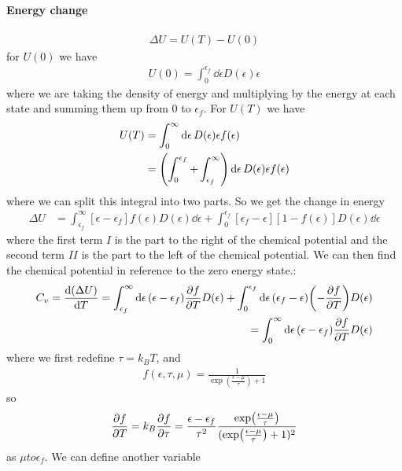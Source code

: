 \documentclass[../main.tex]{subfiles}
\begin{document}
\paragraph*{Energy change}
\begin{align*}
    \Delta U = U(T) - U(0)
\end{align*}
for $U(0)$ we have
\begin{align*}
    U(0) = \int_0^{\epsilon_f} \dd{\epsilon} D(\epsilon) \epsilon
\end{align*}
where we are taking the density of energy and multiplying by the energy at each state and summing 
them up from $0$ to $\epsilon_f$. For $U(T)$ we have
\begin{align*}
    U(T) &= \int_0^{\infty} \dd{\epsilon} D(\epsilon) \epsilon f(\epsilon) \\
    &= \qt(\int_0^{\epsilon_f} + \int_{\epsilon_f}^{\infty})
        \dd{\epsilon} D(\epsilon) \epsilon f(\epsilon)
\end{align*}
where we can split this integral into two parts. So we get the change in energy
\begin{align*}
    \Delta U &= \int_{\epsilon_f}^{\infty} [\epsilon - \epsilon_f] f(\epsilon) D(\epsilon) \dd{\epsilon} 
    + \int_0^{\epsilon_f} [\epsilon_f - \epsilon] [1 - f(\epsilon)] D(\epsilon) \dd{\epsilon}
\end{align*}
where the first term $I$ is the part to the right of the chemical potential and the second term $II$
is the part to the left of the chemical potential. We can then find the chemical potential in 
reference to the zero energy state.:
\begin{align*}
    C_v = \dv{(\Delta U)}{T} = \int_{\epsilon_f}^\infty \dd{\epsilon} 
    (\epsilon - \epsilon_f) \pdv{f}{T} D(\epsilon) + \int_0^{\epsilon_f} \dd{\epsilon} 
    (\epsilon_f - \epsilon) \qt(-\pdv{f}{T}) D(\epsilon) \\
    = \int_0^\infty \dd{\epsilon} (\epsilon - \epsilon_f) \pdv{f}{T} D(\epsilon)
\end{align*}
where we first redefine $\tau = k_B T$, and 
\begin{align*}
    f(\epsilon, \tau, \mu) = \frac{1}{\exp(\frac{\epsilon - \mu}{\tau}) + 1}
\end{align*}
so 
\begin{align*}
    \pdv{f}{T} = k_B \pdv{f}{\tau} = \frac{\epsilon - \epsilon_f}{\tau^2} 
        \frac{\exp(\frac{\epsilon - \mu}{\tau})}{(\exp(\frac{\epsilon - \mu}{\tau}) + 1)^2}
\end{align*}
as $\mu to \epsilon_f$. We can define another variable
\end{document}
